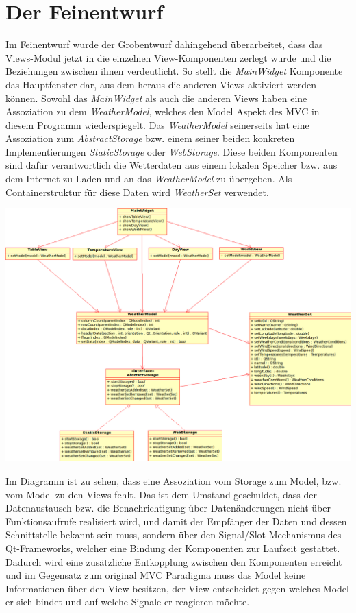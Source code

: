 \documentclass[11pt,a4paper]{scrreprt}
\begin{document}
\chapter{Der Feinentwurf}
Im Feinentwurf wurde der Grobentwurf dahingehend \"uberarbeitet, dass das Views-Modul
jetzt in die einzelnen View-Komponenten zerlegt wurde und die Beziehungen zwischen ihnen
verdeutlicht. So stellt die {\itshape MainWidget} Komponente das Hauptfenster dar, aus
dem heraus die anderen Views aktiviert werden k\"onnen. Sowohl das {\itshape MainWidget}
als auch die anderen Views haben eine Assoziation zu dem {\itshape WeatherModel}, welches
den Model Aspekt des MVC in diesem Programm wiederspiegelt. Das {\itshape WeatherModel}
seinerseits hat eine Assoziation zum {\itshape AbstractStorage} bzw. einem seiner beiden
konkreten Implementierungen {\itshape StaticStorage} oder {\itshape WebStorage}.
Diese beiden Komponenten sind daf\"ur verantwortlich die Wetterdaten aus einem lokalen
Speicher bzw. aus dem Internet zu Laden und an das {\itshape WeatherModel} zu \"ubergeben.
Als Containerstruktur f\"ur diese Daten wird {\itshape WeatherSet} verwendet.

\begin{center}
  \includegraphics[width=14cm]{feinentwurf.png}
\end{center}

Im Diagramm ist zu sehen, dass eine Assoziation vom Storage zum Model, bzw. vom Model
zu den Views fehlt. Das ist dem Umstand geschuldet, dass der Datenaustausch bzw. die
Benachrichtigung \"uber Daten\"anderungen nicht \"uber Funktionsaufrufe realisiert wird,
und damit der Empf\"anger der Daten und dessen Schnittstelle bekannt sein muss, sondern
\"uber den Signal/Slot-Mechanismus des Qt-Frameworks, welcher eine Bindung der Komponenten
zur Laufzeit gestattet. Dadurch wird eine zus\"atzliche Entkopplung zwischen den Komponenten
erreicht und im Gegensatz zum original MVC Paradigma muss das Model keine Informationen
\"uber den View besitzen, der View entscheidet gegen welches Model er sich bindet und auf
welche Signale er reagieren m\"ochte.
\end{document}
